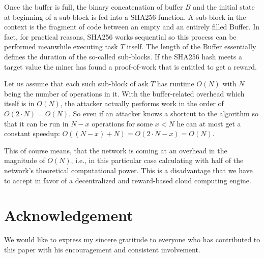 \documentclass{sig-alternate}
\begin{document}
Once the buffer is full, the binary concatenation of buffer $B$ and the initial state at beginning of a sub-block is fed into a SHA256 function. A sub-block in the context is the fragment of code between an empty and an entirely filled Buffer. In fact, for practical reasons, SHA256 works sequential so this process can be performed meanwhile executing task $T$ itself. The length of the Buffer essentially defines the duration of the so-called sub-blocks. If the SHA256 hash meets a target value the miner has found a proof-of-work that is entitled to get a reward.

Let us assume that each such sub-block of ask $T$ has runtime $O(N)$ with $N$ being the number of operations in it. With the buffer-related overhead which itself is in $O(N)$, the attacker actually performs work in the order of $O(2 \cdot N) = O(N)$. So even if an attacker knows a shortcut to the algorithm so that it can be run in $N-x$ operations for some $x<N$ he can at most get a constant speedup: $O((N-x)+N) = O(2 \cdot N-x) = O(N)$.

This of course means, that the network is coming at an overhead in the magnitude of $O(N)$, i.e., in this particular case calculating with half of the network's theoretical computational power. This is a disadvantage that we have to accept in favor of a decentralized and reward-based cloud computing engine.

\section*{Acknowledgement}

We would like to express my sincere gratitude to everyone who has contributed to this paper with his encouragement and consistent involvement.



\end{document}
